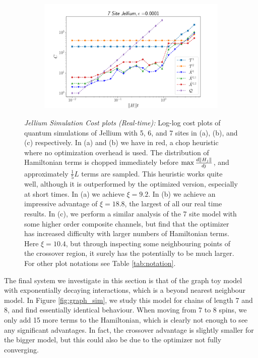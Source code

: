 \begin{figure}[h!]
\begin{subfigure}[b]{.49\textwidth}
            \caption{}
        \end{subfigure}
        \begin{subfigure}[b]{.49\textwidth}
            \includegraphics[width=1\textwidth]{composite_numerics/Jellium7.png}
            \caption{}
        \end{subfigure}
        \caption{\textit{Jellium Simulation Cost plots (Real-time): } Log-log cost plots of quantum simulations of Jellium with 5, 6, and 7 sites in (a), (b), and (c) respectively. In (a) and (b) we have in red, a chop heuristic where no optimization overhead is used. The distribution of Hamiltonian terms is chopped immediately before $\max \frac{d \norm{H_j}}{dj}$, and approximately $\frac{1}{5}L$ terms are sampled. This heuristic works quite well, although it is outperformed by the optimized version, especially at short times. In (a) we achieve $\xi = 9.2$. In (b) we achieve an impressive advantage of $\xi =  18.8$, the largest of all our real time results. In (c), we perform a similar analysis of the 7 site model with some higher order composite channels, but find that the optimizer has increased difficulty with larger numbers of Hamiltonian terms. Here $\xi = 10.4$, but through inspecting some neighbouring points of the crossover region, it surely has the potentially to be much larger. For other plot notations see Table \ref{tab:notation}.} \label{fig:Jellium56}
\end{figure}
\FloatBarrier

The final system we investigate in this section is that of the graph toy model with exponentially decaying interactions, which is a beyond nearest neighbour model. In Figure \ref{fig:graph_sim}, we study this model for chains of length 7 and 8, and find essentially identical behaviour. When moving from 7 to 8 spins, we only add 15 more terms to the Hamiltonian, which is clearly not enough to see any significant advantages. In fact, the crossover advantage is slightly smaller for the bigger model, but this could also be due to the optimizer not fully converging. 

